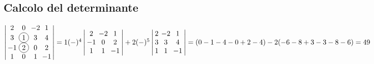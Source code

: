 \subsection{Calcolo del determinante}

\(
\left|
	\arraycolsep=1.5pt\def\arraystretch{1.0}
	\begin{array}{cccc}
		2 & 0 & -2 & 1 \\
		3 & \circled{1} & 3 & 4 \\
		-1 & \circled{2} & 0 & 2 \\
		1 & 0 & 1 & -1 \\
	\end{array}
\right|
=
1 (-)^4
	\left|
		\arraycolsep=2.0pt\def\arraystretch{1.0}
		\begin{array}{ccc}
			2 & -2 & 1 \\
			-1 & 0 & 2 \\
			1 & 1 & -1 \\
		\end{array}
	\right|
+ 2 (-)^5
	\left|
		\arraycolsep=2.0pt\def\arraystretch{1.0}
		\begin{array}{ccc}
			2 & -2 & 1 \\
			3 & 3 & 4 \\
			1 & 1 & -1 \\
		\end{array}
	\right|
=
(0-1-4-0+2-4) -2(-6-8+3-3-8-6) = 49
\)
